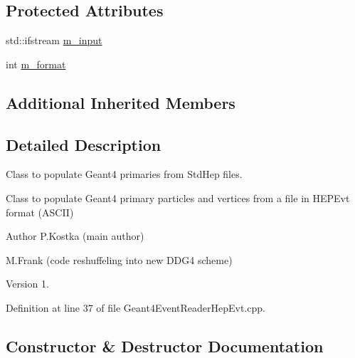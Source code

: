 \subsection*{Protected Attributes}
\begin{DoxyCompactItemize}
\item 
std\+::ifstream \hyperlink{class_d_d4hep_1_1_simulation_1_1_geant4_event_reader_hep_evt_ac65db88522c8b307f04ae3ec193fbcb5}{m\+\_\+input}
\item 
int \hyperlink{class_d_d4hep_1_1_simulation_1_1_geant4_event_reader_hep_evt_a7d4105611f4277b52394d78aae4de38e}{m\+\_\+format}
\end{DoxyCompactItemize}
\subsection*{Additional Inherited Members}


\subsection{Detailed Description}
Class to populate Geant4 primaries from Std\+Hep files. 

Class to populate Geant4 primary particles and vertices from a file in H\+E\+P\+Evt format (A\+S\+C\+II)

\begin{DoxyAuthor}{Author}
P.\+Kostka (main author) 

M.\+Frank (code reshuffeling into new D\+D\+G4 scheme) 
\end{DoxyAuthor}
\begin{DoxyVersion}{Version}
1. 
\end{DoxyVersion}


Definition at line 37 of file Geant4\+Event\+Reader\+Hep\+Evt.\+cpp.



\subsection{Constructor \& Destructor Documentation}
\hypertarget{class_d_d4hep_1_1_simulation_1_1_geant4_event_reader_hep_evt_a574587ff2aba3dc97af5e2e4c63d777c}{}\label{class_d_d4hep_1_1_simulation_1_1_geant4_event_reader_hep_evt_a574587ff2aba3dc97af5e2e4c63d777c} 
